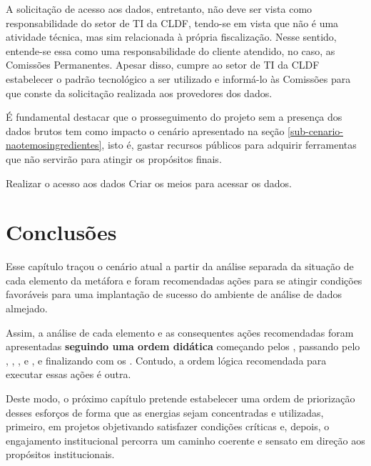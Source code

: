     A solicitação de acesso aos dados, entretanto, não deve ser vista como responsabilidade do setor de TI da CLDF, tendo-se em vista que não é uma atividade técnica, mas sim relacionada à própria fiscalização. Nesse sentido, entende-se essa como uma responsabilidade do cliente atendido, no caso, as Comissões Permanentes. Apesar disso, cumpre ao setor de TI da CLDF estabelecer o padrão tecnológico a ser utilizado e informá-lo às Comissões para que conste da solicitação realizada aos provedores dos dados.
    
    É fundamental destacar que o prosseguimento do projeto sem a presença dos dados brutos tem como impacto o cenário apresentado na seção \ref{sub-cenario-naotemosingredientes}, isto é, gastar recursos públicos para adquirir ferramentas que não servirão para atingir os propósitos finais. 
    
    \begin{env-proposta}{Realizar o acesso aos dados}
        \nohyphens{Criar os meios para acessar os dados.}
    \end{env-proposta}    
    
    \section{Conclusões}

    Esse capítulo traçou o cenário atual a partir da análise separada da situação de cada elemento da metáfora e foram recomendadas ações para se atingir condições favoráveis para uma implantação de sucesso do ambiente de análise de dados almejado. 
    
    Assim, a análise de cada elemento e as consequentes ações recomendadas foram apresentadas \textbf{seguindo uma ordem didática} começando pelos \CLIENTES, passando pelo \CARDAPIO, \LIVRODERECEITAS, \FOGAO, \GERENTES \xspace e \COZINHEIROS, \DESPENSA  \xspace e finalizando com os \INGREDIENTES. Contudo, a ordem lógica recomendada para executar essas ações é outra.
    
    Deste modo, o próximo capítulo pretende estabelecer uma ordem de priorização desses esforços de forma que as energias sejam concentradas e utilizadas, primeiro, em projetos objetivando satisfazer condições críticas e, depois, o engajamento institucional percorra um caminho coerente e sensato em direção aos propósitos institucionais.